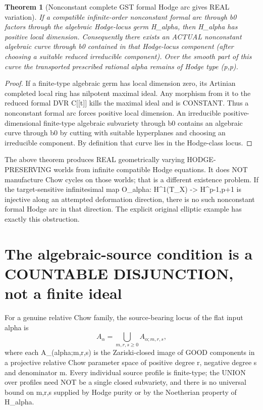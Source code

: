 \documentclass[11pt]{article}
\newtheorem{theorem}{Theorem}
\begin{document}
\begin{theorem}[Nonconstant complete GST formal Hodge arc gives REAL variation]
If a compatible infinite-order nonconstant formal
arc through b0 factors through the algebraic Hodge-locus
germ H_alpha, then H_alpha has positive local dimension.
Consequently there exists an ACTUAL nonconstant algebraic
curve through b0 contained in that Hodge-locus component
(after choosing a suitable reduced irreducible component).
Over the smooth part of this curve the transported
prescribed rational alpha remains of Hodge type (p,p).
\end{theorem}
\begin{proof}
If a finite-type algebraic germ has local dimension zero,
its Artinian completed local ring has nilpotent maximal
ideal. Any morphism from it to the reduced formal DVR
C[[t]] kills the maximal ideal and is CONSTANT.
Thus a nonconstant formal arc forces positive local
dimension. An irreducible positive-dimensional
finite-type algebraic subvariety through b0 contains
an algebraic curve through b0 by cutting with suitable
hyperplanes and choosing an irreducible component.
By definition that curve lies in the Hodge-class locus.
\end{proof}

The above theorem produces REAL geometrically varying
HODGE-PRESERVING worlds from infinite compatible
Hodge equations. It does NOT manufacture Chow cycles
on those worlds; that is a different existence problem.
If the target-sensitive infinitesimal map
O_alpha: H^1(T_X) -> H^{p-1,p+1}
is injective along an attempted deformation direction,
there is no such nonconstant formal Hodge arc in that
direction. The explicit original elliptic example
has exactly this obstruction.

\section{The algebraic-source condition is a COUNTABLE DISJUNCTION, not a finite ideal}
For a genuine relative Chow family, the source-bearing
locus of the flat input alpha is
\[
\boxed{
A_\alpha=\bigcup_{m,r,s\ge0}A_{\alpha;m,r,s},
}
\]
where each A_(alpha;m,r,s) is the Zariski-closed
image of GOOD components in a projective relative
Chow parameter space of positive degree r,
negative degree s and denominator m.
Every individual source profile is finite-type;
the UNION over profiles need NOT be a single closed
subvariety, and there is no universal bound on
m,r,s supplied by Hodge purity or by the
Noetherian property of H_alpha.
\end{document}
